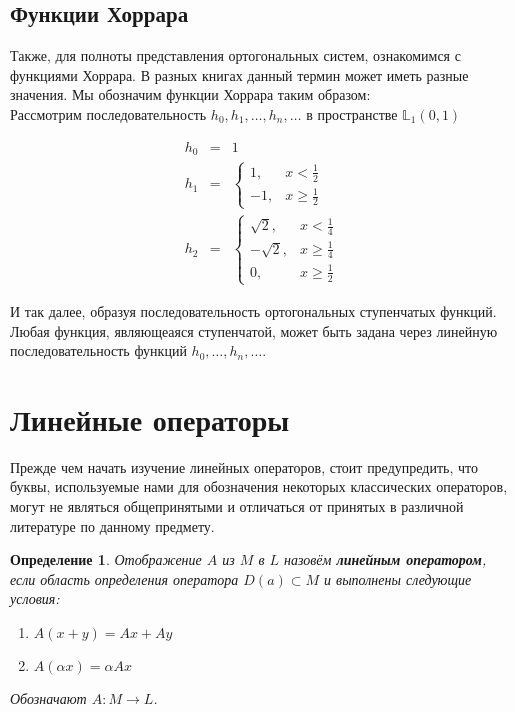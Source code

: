\documentclass[12pt]{article}
\renewcommand{\geq}{\geqslant}
\newtheorem{defi}{Определение}[section]
\begin{document}
	\subsection*{Функции Хоррара}
	
	Также, для полноты представления ортогональных систем, ознакомимся с функциями Хоррара. В разных книгах данный термин
	может иметь разные значения. Мы обозначим функции Хоррара таким образом: \\
	Рассмотрим последовательность $h_0, h_1, \dots, h_n, \dots$ в пространстве $\mathbb{L}_1(0, 1)$
	
	\begin{eqnarray*}
		h_0& =& 1 \\		
		h_1& =& 
		\begin{cases}
			1, & x < \frac{1}{2} \\
			-1, & x \geq \frac{1}{2}
		\end{cases} \\		
		h_2& =& 
		\begin{cases}
			\sqrt{2}, & x < \frac{1}{4} \\
			-\sqrt{2}, & x \geq \frac{1}{4} \\
			0, & x \geq \frac{1}{2}
		\end{cases}
	\end{eqnarray*}
	
	И так далее, образуя последовательность ортогональных ступенчатых функций. Любая функция, являющеаяся ступенчатой, может
	быть задана через линейную последовательность функций $h_0, \dots, h_n, \dots$.
	
	\section*{Линейные операторы}
	
	Прежде чем начать изучение линейных операторов, стоит предупредить, что буквы, используемые нами для обозначения некоторых
	классических операторов, могут не являться общепринятыми и отличаться от принятых в различной литературе по данному предмету.
	
	\begin{defi}
		Отображение $A$ из $M$ в $L$ назовём \textbf{линейным оператором}, если область определения оператора
		$D(a) \subset M$ и выполнены следующие условия:
		\begin{enumerate}
			\item $A(x + y) = Ax + Ay$
			\item $A(\alpha x) = \alpha A x$ 
		\end{enumerate}
		Обозначают $A : M \rightarrow L$.
	\end{defi}
	
\end{document}
